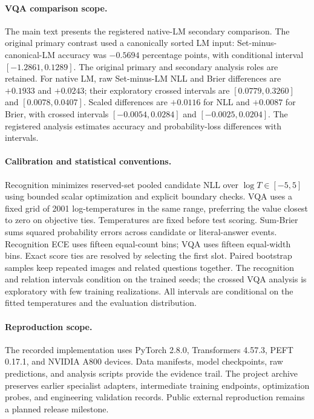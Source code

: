 \paragraph{VQA comparison scope.}
The main text presents the registered native-LM secondary comparison. The original primary contrast used a canonically sorted LM input: Set-minus-canonical-LM accuracy was $-0.5694$ percentage points, with conditional interval $[-1.2861,0.1289]$. The original primary and secondary analysis roles are retained. For native LM, raw Set-minus-LM NLL and Brier differences are $+0.1933$ and $+0.0243$; their exploratory crossed intervals are $[0.0779,0.3260]$ and $[0.0078,0.0407]$. Scaled differences are $+0.0116$ for NLL and $+0.0087$ for Brier, with crossed intervals $[-0.0054,0.0284]$ and $[-0.0025,0.0204]$. The registered analysis estimates accuracy and probability-loss differences with intervals.

\paragraph{Calibration and statistical conventions.}
Recognition minimizes reserved-set pooled candidate NLL over $\log T\in[-5,5]$ using bounded scalar optimization and explicit boundary checks. VQA uses a fixed grid of 2001 log-temperatures in the same range, preferring the value closest to zero on objective ties. Temperatures are fixed before test scoring. Sum-Brier sums squared probability errors across candidate or literal-answer events. Recognition ECE uses fifteen equal-count bins; VQA uses fifteen equal-width bins. Exact score ties are resolved by selecting the first slot. Paired bootstrap samples keep repeated images and related questions together. The recognition and relation intervals condition on the trained seeds; the crossed VQA analysis is exploratory with few training realizations. All intervals are conditional on the fitted temperatures and the evaluation distribution.

\paragraph{Reproduction scope.}
The recorded implementation uses PyTorch 2.8.0, Transformers 4.57.3, PEFT 0.17.1, and NVIDIA A800 devices. Data manifests, model checkpoints, raw predictions, and analysis scripts provide the evidence trail. The project archive preserves earlier specialist adapters, intermediate training endpoints, optimization probes, and engineering validation records. Public external reproduction remains a planned release milestone.

